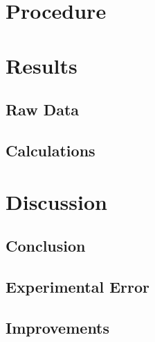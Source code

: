\documentclass{article}
\begin{document}
\section*{Procedure} %

\section*{Results} %
\subsection*{Raw Data} %

\subsection*{Calculations}%

\section*{Discussion}%
\subsection*{Conclusion}

\subsection*{Experimental Error} %

\subsection*{Improvements} %
\end{document}
